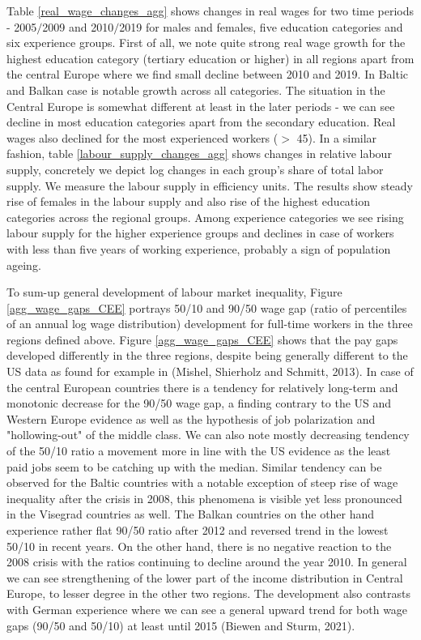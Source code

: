 \documentclass{article}
\begin{document}
Table \ref{real_wage_changes_agg} shows changes in real wages for two time periods - 2005$/$2009 and 2010$/$2019 for males and females, five education categories and six experience groups. First of all, we note quite strong real wage growth for the highest education category (tertiary education or higher) in all regions apart from the central Europe where we find small decline between 2010 and 2019. In Baltic and Balkan case is notable growth across all categories. The situation in the Central Europe is somewhat different at least in the later periods - we can see decline in most education categories apart from the secondary education. Real wages also declined for the most experienced workers ($>$ 45).
In a similar fashion, table \ref{labour_supply_changes_agg} shows changes in relative labour supply, concretely we depict log changes in each group's share of total labor supply. We measure the labour supply in efficiency units. The results show steady rise of females in the labour supply and also rise of the highest education categories across the regional groups. Among experience categories we see rising labour supply for the higher experience groups and declines in case of workers with less than five years of working experience, probably a sign of population ageing.

To sum-up general development of labour market inequality, Figure \ref{agg_wage_gaps_CEE} portrays 50/10 and 90/50 wage gap (ratio of percentiles of an annual log wage distribution) development for full-time workers in the three regions defined above.
Figure \ref{agg_wage_gaps_CEE} shows that the pay gaps developed differently in the three regions, despite being generally different to the US data as found for example in (Mishel, Shierholz and Schmitt, 2013). In case of the central European countries there is a tendency for relatively long-term and monotonic decrease for the 90/50 wage gap, a finding contrary to the US and Western Europe evidence as well as the hypothesis of job polarization and "hollowing-out" of the middle class. We can also note mostly decreasing tendency of the 50/10 ratio a movement more in line with the US evidence as the least paid jobs seem to be catching up with the median. Similar tendency can be observed for the Baltic countries with a notable exception of steep rise of wage inequality after the crisis in 2008, this phenomena is visible yet less pronounced in the Visegrad countries as well. The Balkan countries on the other hand experience rather flat 90/50 ratio after 2012 and reversed trend in the lowest 50/10 in recent years. On the other hand, there is no negative reaction to the 2008 crisis with the ratios continuing to decline around the year 2010.
In general we can see strengthening of the lower part of the income distribution in Central Europe, to lesser degree in the other two regions. The development also contrasts with German experience where we can see a general upward trend for both wage gaps (90/50 and 50/10) at least until 2015 (Biewen and Sturm, 2021).
\end{document}
